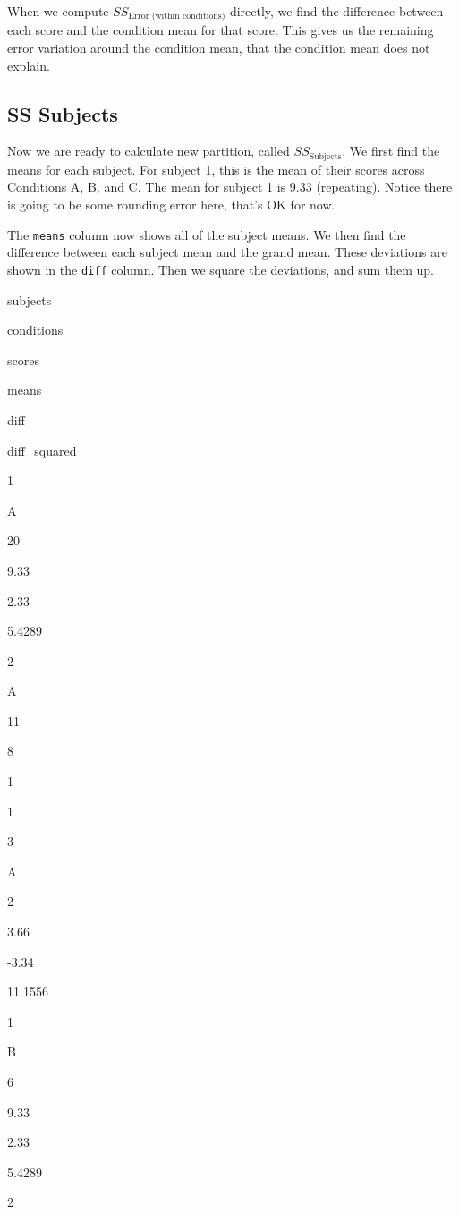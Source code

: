\documentclass[
]{book}
\begin{document}
When we compute \(SS_\text{Error (within conditions)}\) directly, we find the difference between each score and the condition mean for that score. This gives us the remaining error variation around the condition mean, that the condition mean does not explain.

\hypertarget{ss-subjects}{%
\subsection{SS Subjects}\label{ss-subjects}}

Now we are ready to calculate new partition, called \(SS_\text{Subjects}\). We first find the means for each subject. For subject 1, this is the mean of their scores across Conditions A, B, and C. The mean for subject 1 is 9.33 (repeating). Notice there is going to be some rounding error here, that's OK for now.

The \texttt{means} column now shows all of the subject means. We then find the difference between each subject mean and the grand mean. These deviations are shown in the \texttt{diff} column. Then we square the deviations, and sum them up.

subjects

conditions

scores

means

diff

diff\_squared

1

A

20

9.33

2.33

5.4289

2

A

11

8

1

1

3

A

2

3.66

-3.34

11.1556

1

B

6

9.33

2.33

5.4289

2
\end{document}
